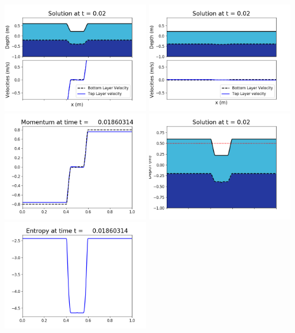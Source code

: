 \documentclass[11pt]{article}
\begin{document}
\vskip 10pt 
\includegraphics[width=0.475\textwidth]{frame0052fig1001.png}
\includegraphics[width=0.475\textwidth]{frame0052fig1002.png}
\vskip 10pt 
\includegraphics[width=0.475\textwidth]{frame0052fig1003.png}
\includegraphics[width=0.475\textwidth]{frame0052fig1006.png}
\vskip 10pt 
\includegraphics[width=0.475\textwidth]{frame0052fig1007.png}
\end{document}
